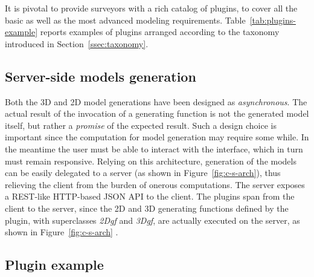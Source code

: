 \noindent
It is pivotal to provide surveyors with a rich catalog of plugins, to cover all the basic as well as the most advanced modeling requirements. Table~\ref{tab:plugins-example} reports examples of plugins arranged according to the  taxonomy introduced in Section~\ref{ssec:taxonomy}.


\subsection{Server-side models generation}

\noindent
Both the 3D and 2D model generations have been designed as \emph{asynchronous}. The actual result of the invocation of a generating function is not the generated model itself, but rather a \emph{promise} of the expected result. Such a design choice is important since the computation for model generation may require some while. In the meantime the user must be able to interact with the interface, which in turn must remain responsive. Relying on this architecture, generation of the models can be easily delegated to a server (as shown in Figure~\ref{fig:c-s-arch}), thus relieving the client from the burden of onerous computations. The server exposes a REST-like HTTP-based JSON API to the client. The plugins span from the client to the server, since the 2D and 3D generating functions  defined by the plugin, with superclasses \emph{2Dgf} and \emph{3Dgf}, are actually executed on the server, as shown in Figure~\ref{fig:c-s-arch} .


\subsection{Plugin example}

